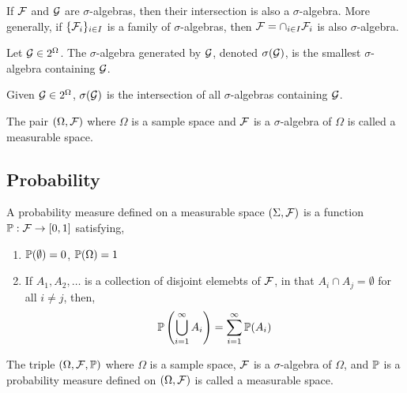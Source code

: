 \documentclass[12pt]{article}
\begin{document}
\begin{lemma}
If \( \mathcal{F} \) and \( \mathcal{G} \) are \( \sigma \)-algebras, then their intersection is also a \( \sigma \)-algebra. More generally, if \( \{\mathcal{F}_i\}_{i\in I} \) is a family of \( \sigma \)-algebras, then \( \mathcal{F} = \cap_{i\in I} \mathcal{F}_i \) is also \( \sigma \)-algebra.
\end{lemma}


\begin{definition}
Let \( \mathcal{G} \in 2^\Omega \). The \( \sigma \)-algebra generated by \( \mathcal{G} \), denoted \( \sigma(\mathcal{G}) \), is the smallest \( \sigma \)-algebra containing \( \mathcal{G} \).
\end{definition}

\begin{theorem}
Given \( \mathcal{G} \in 2^\Omega \), \( \sigma(\mathcal{G}) \) is the intersection of all \( \sigma \)-algebras containing \( \mathcal{G} \).
\end{theorem}

\begin{definition}
The pair \( (\Omega, \mathcal{F}) \) where \( \Omega \) is a sample space and \( \mathcal{F} \) is a \( \sigma \)-algebra of \( \Omega \) is called a measurable space.
\end{definition}

\subsection{Probability}
\begin{definition}
A probability measure defined on a measurable space \( (\Sigma, \mathcal{F}) \) is a function \( \mathbb{P}: \mathcal{F} \to [0,1] \) satisfying,
\begin{enumerate}[nolistsep]
    \item \( \mathbb{P}(\emptyset) = 0 \), \( \mathbb{P}(\Omega) = 1 \)
    \item If \( A_1, A_2, \ldots \) is a collection of disjoint elemebts of \( \mathcal{F} \), in that \( A_i\cap A_j = \emptyset \) for all \( i\neq j \), then,
    \begin{align*}
        \mathbb{P} \left( \bigcup_{i=1}^{\infty}A_i \right) = \sum_{i=1}^{\infty} \mathbb{P}(A_i)
    \end{align*}
\end{enumerate}
\end{definition}

\begin{definition}
The triple \( (\Omega, \mathcal{F}, \mathbb{P}) \) where \( \Omega \) is a sample space, \( \mathcal{F} \) is a \( \sigma \)-algebra of \( \Omega \), and \( \mathbb{P} \) is a probability measure defined on \( (\Omega,\mathcal{F}) \) is called a measurable space.
\end{definition}
\end{document}
